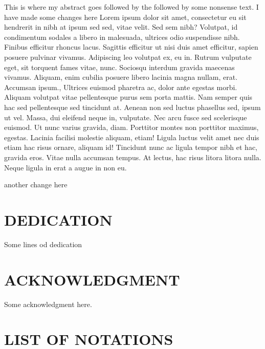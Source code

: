 \documentclass{source/tex/templates/maththesis}
\begin{document}
This is where my abstract goes followed by the followed by some nonsense text. I have made some changes here Lorem ipsum dolor sit amet, consectetur eu sit hendrerit in nibh at ipsum sed sed, vitae velit. Sed sem nibh? Volutpat, id condimentum sodales a libero in malesuada, ultrices odio suspendisse nibh. Finibus efficitur rhoncus lacus. Sagittis efficitur ut nisi duis amet efficitur, sapien posuere pulvinar vivamus. Adipiscing leo volutpat ex, eu in. Rutrum vulputate eget, sit torquent fames vitae, nunc. Sociosqu interdum gravida maecenas vivamus. Aliquam, enim cubilia posuere libero lacinia magna nullam, erat. Accumsan ipsum., Ultrices euismod pharetra ac, dolor ante egestas morbi. Aliquam volutpat vitae pellentesque purus sem porta mattis. Nam semper quis hac sed pellentesque sed tincidunt at. Aenean non sed luctus phasellus sed, ipsum ut vel. Massa, dui eleifend neque in, vulputate. Nec arcu fusce sed scelerisque euismod. Ut nunc varius gravida, diam. Porttitor montes non porttitor maximus, egestas. Lacinia facilisi molestie aliquam, etiam! Ligula luctus velit amet nec duis etiam hac risus ornare, aliquam id! Tincidunt nunc ac ligula tempor nibh et hac, gravida eros. Vitae nulla accumsan tempus. At lectus, hac risus litora litora nulla. Neque ligula in erat a augue in non eu.

another change here

\hypertarget{dedication}{%
\chapter*{DEDICATION}\label{dedication}}

Some lines od dedication

\hypertarget{acknowledgment}{%
\chapter*{ACKNOWLEDGMENT}\label{acknowledgment}}

Some acknowledgment here.

\tableofcontents
{}

\newpage
{}\setcounter{page}{1}

\hypertarget{list-of-notations}{%
\chapter*{LIST OF NOTATIONS}\label{list-of-notations}}
\end{document}
